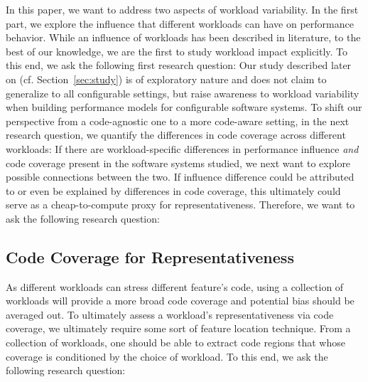 In this paper, we want to address two aspects of workload variability. In the first part, we explore the influence that different workloads can have on performance behavior. While an influence of workloads has been described in literature, to the best of our knowledge, we are the first to study workload impact explicitly. To this end, we ask the following first research question:
Our study described later on (cf. Section~\ref{sec:study}) is of exploratory nature and does not claim to generalize to all configurable settings, but raise awareness to workload variability when building performance models for configurable software systems. 
To shift our perspective from a code-agnostic one to a more code-aware setting, in the next research question, we quantify the differences in code coverage across different workloads:
If there are workload-specific differences in performance influence \emph{and} code coverage present in the software systems studied, we next want to explore possible connections between the two. If influence difference could be attributed to or even be explained by differences in code coverage, this ultimately could serve as a cheap-to-compute proxy for representativeness. Therefore, we want to ask the following research question:

\subsection{Code Coverage for Representativeness}
As different workloads can stress different feature's code, using a collection of workloads will provide a more broad code coverage and potential bias should be averaged out. To ultimately assess a workload's representativeness via code coverage, we ultimately require some sort of feature location technique. From a collection of workloads, one should be able to extract code regions that whose coverage is conditioned by the choice of workload. To this end, we ask the following research question:





